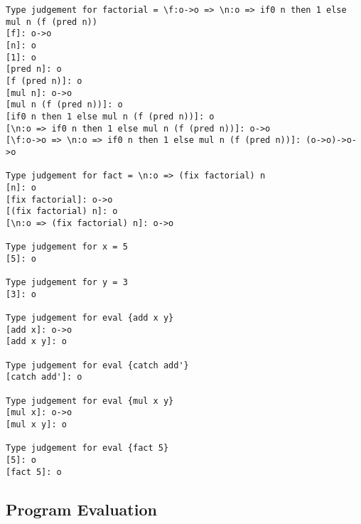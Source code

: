 \documentclass[12pt,a4paper]{report}
\theoremstyle{definition}
\theoremstyle{remark}
\begin{document}
\begin{verbatim}
Type judgement for factorial = \f:o->o => \n:o => if0 n then 1 else mul n (f (pred n))
[f]: o->o
[n]: o
[1]: o
[pred n]: o
[f (pred n)]: o
[mul n]: o->o
[mul n (f (pred n))]: o
[if0 n then 1 else mul n (f (pred n))]: o
[\n:o => if0 n then 1 else mul n (f (pred n))]: o->o
[\f:o->o => \n:o => if0 n then 1 else mul n (f (pred n))]: (o->o)->o->o

Type judgement for fact = \n:o => (fix factorial) n
[n]: o
[fix factorial]: o->o
[(fix factorial) n]: o
[\n:o => (fix factorial) n]: o->o

Type judgement for x = 5
[5]: o

Type judgement for y = 3
[3]: o

Type judgement for eval {add x y}
[add x]: o->o
[add x y]: o

Type judgement for eval {catch add'}
[catch add']: o

Type judgement for eval {mul x y}
[mul x]: o->o
[mul x y]: o

Type judgement for eval {fact 5}
[5]: o
[fact 5]: o
\end{verbatim}

\subsection{Program Evaluation}
\end{document}
